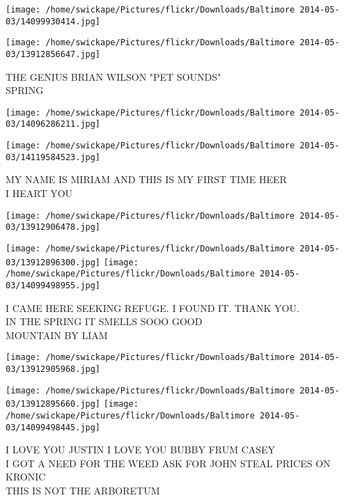 \documentclass[10pt,letterpaper]{article}
\begin{document}
\texttt{[image: /home/swickape/Pictures/flickr/Downloads/Baltimore 2014-05-03/14099930414.jpg]}

\vspace{0.25in}
\texttt{[image: /home/swickape/Pictures/flickr/Downloads/Baltimore 2014-05-03/13912856647.jpg]}

THE GENIUS BRIAN WILSON "PET SOUNDS"\\
SPRING\\
\pagebreak

\texttt{[image: /home/swickape/Pictures/flickr/Downloads/Baltimore 2014-05-03/14096286211.jpg]}

\vspace{0.25in}
\texttt{[image: /home/swickape/Pictures/flickr/Downloads/Baltimore 2014-05-03/14119584523.jpg]}

MY NAME IS MIRIAM AND THIS IS MY FIRST TIME HEER\\
I HEART YOU\\
\pagebreak

\texttt{[image: /home/swickape/Pictures/flickr/Downloads/Baltimore 2014-05-03/13912906478.jpg]}

\vspace{0.25in}
\texttt{[image: /home/swickape/Pictures/flickr/Downloads/Baltimore 2014-05-03/13912896300.jpg]}
\texttt{[image: /home/swickape/Pictures/flickr/Downloads/Baltimore 2014-05-03/14099498955.jpg]}

I CAME HERE SEEKING REFUGE. I FOUND IT.  THANK YOU.\\
IN THE SPRING IT SMELLS SOOO GOOD\\
MOUNTAIN BY LIAM\\
\pagebreak

\texttt{[image: /home/swickape/Pictures/flickr/Downloads/Baltimore 2014-05-03/13912905968.jpg]}

\vspace{0.25in}
\texttt{[image: /home/swickape/Pictures/flickr/Downloads/Baltimore 2014-05-03/13912895660.jpg]}
\texttt{[image: /home/swickape/Pictures/flickr/Downloads/Baltimore 2014-05-03/14099498445.jpg]}

I LOVE YOU JUSTIN I LOVE YOU BUBBY FRUM CASEY\\
I GOT A NEED FOR THE WEED ASK FOR JOHN STEAL PRICES ON KRONIC\\
THIS IS NOT THE ARBORETUM\\
\pagebreak
\end{document}
